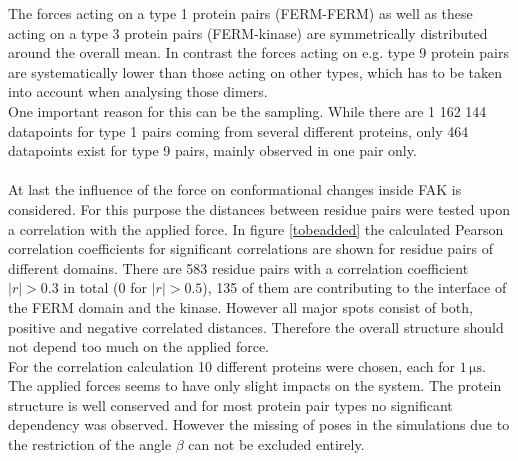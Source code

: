 The forces acting on a type 1 protein pairs (FERM-FERM) as well as these acting on a type 3 protein pairs (FERM-kinase) are symmetrically distributed around the overall mean. In contrast the forces acting on e.g. type 9 protein pairs are systematically lower than those acting on other types, which has to be taken into account when analysing those dimers.\\
One important reason for this can be the sampling. While there are 1 162 144 datapoints for type 1 pairs coming from several different proteins, only 464 datapoints exist for type 9 pairs, mainly observed in one pair only.\\
\\
At last the influence of the force on conformational changes inside FAK is considered. For this purpose the distances between residue pairs were tested upon a correlation with the applied force. In figure \autoref{tobeadded} the calculated Pearson correlation coefficients for significant correlations are shown for residue pairs of different domains. There are 583 residue pairs with a correlation coefficient $|r| > 0.3$ in total (0 for $|r| > 0.5$), 135 of them are contributing to the interface of the FERM domain and the kinase. However all major spots consist of both, positive and negative correlated distances. Therefore the overall structure should not depend too much on the applied force.\\
For the correlation calculation 10 different proteins were chosen, each for $1\,\si{\micro\second}$.
\\
The applied forces seems to have only slight impacts on the system. The protein structure is well conserved and for most protein pair types no significant dependency was observed. However the missing of poses in the simulations due to the restriction of the angle $\beta$ can not be excluded entirely.
